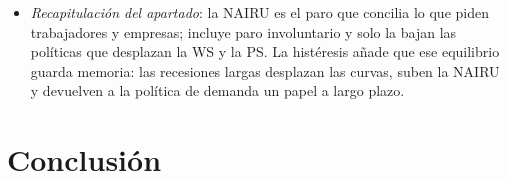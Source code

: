 \documentclass[11pt]{article}
\begin{document}
\begin{itemize}
\item \emph{Recapitulación del apartado}: la NAIRU es el paro que concilia lo que piden trabajadores y empresas; incluye paro involuntario y solo la bajan las políticas que desplazan la WS y la PS. La histéresis añade que ese equilibrio guarda memoria: las recesiones largas desplazan las curvas, suben la NAIRU y devuelven a la política de demanda un papel a largo plazo.
\end{itemize}


\section*{Conclusión}
\end{document}
